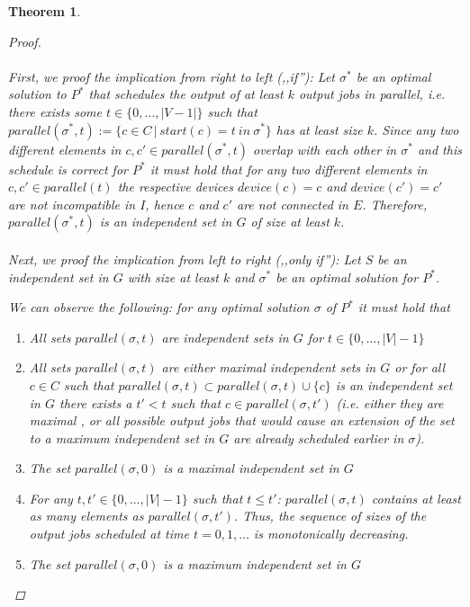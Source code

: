 \documentclass{article}
\newtheorem{mythm}{Theorem}
\begin{document}
\begin{mythm}
\begin{proof}
\paragraph{}
First, we proof the implication from right to left (,,if''):  Let  $\sigma^*$ be an optimal solution to $P^*$ that schedules the  output of at least $k$ output jobs in parallel, i.e. there exists some $t \in \{0, \ldots, |V-1| \}$ such that ${parallel}(\sigma^*, t) := \{  c \in C  \, |\,   {start}(c) = t  \ in\  \sigma^*\}$  has at  least size $k$. Since any two different elements in $c,c' \in {parallel}(\sigma^*, t)$  overlap with each other in  $\sigma^*$ and this schedule  is correct for $P^*$ it must hold that for any two different elements in $c,c' \in {parallel}(t)$ the respective devices ${device}(c) = c$ and   ${device}(c') = {c'}$ are not incompatible in $I$, hence $c$ and $c'$ are not connected in $E$. Therefore, ${parallel}(\sigma^*,t)$ is an independent set in $G$ of size at least $k$.

\paragraph{}
Next, we proof the implication from left to right (,,only if''):  Let $S$ be an independent set in $G$ with size at least $k$ and $\sigma^*$ be an optimal solution for $P^*$. 

We can observe the following: for {\em any optimal} solution $\sigma$ of $P^*$ it must hold that
\begin{enumerate}
\item All sets ${parallel}(\sigma, t)$ are independent sets in $G$ for $t \in \{0, \ldots, |V|-1\}$
\item All sets ${parallel}(\sigma, t)$ are either maximal independent sets in $G$ or for all $c \in C$ such that ${parallel}(\sigma, t) \subset {parallel}(\sigma, t) \cup \{c\}$ is an independent set  in $G$ there exists a $t' < t$ such that $c \in {parallel}(\sigma, t')$   (i.e. either they are maximal , or all possible output jobs that would cause an extension of the set to a maximum independent set in $G$ are already scheduled earlier in $\sigma$). 
\item The set ${parallel}(\sigma, 0)$ is a maximal independent set in $G$
\item For any $t,t' \in \{0, \ldots, |V| - 1\}$ such that $t \leq t'$:  ${parallel}(\sigma, t)$ contains at least as many elements as ${parallel}(\sigma, t')$.  Thus, the sequence of sizes of the output jobs scheduled at time $t=0,1,\ldots$ is monotonically decreasing.
\item The set ${parallel}(\sigma, 0)$ is a maximum independent set in $G$


\end{enumerate}
\end{proof}
\end{mythm}
\end{document}
